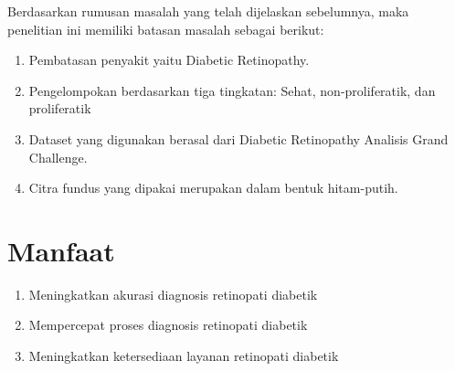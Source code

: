 Berdasarkan rumusan masalah yang telah dijelaskan sebelumnya, maka penelitian ini memiliki batasan masalah sebagai berikut:
\begin{enumerate}
	\item Pembatasan penyakit yaitu Diabetic Retinopathy.
	\item Pengelompokan berdasarkan tiga tingkatan: Sehat, non-proliferatik, dan proliferatik
	\item Dataset yang digunakan berasal dari Diabetic Retinopathy Analisis Grand Challenge.
	\item Citra fundus yang dipakai merupakan dalam bentuk hitam-putih.
\end{enumerate}

\section{Manfaat}
\label{sec:Manfaat}

\begin{enumerate}
	\item Meningkatkan akurasi diagnosis retinopati diabetik
	\item Mempercepat proses diagnosis retinopati diabetik
	\item Meningkatkan ketersediaan layanan retinopati diabetik
\end{enumerate}
